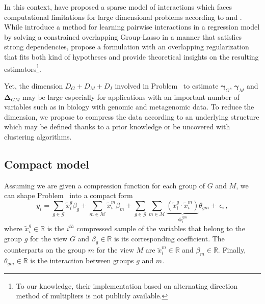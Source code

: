 \documentclass[]{book}
\let\rmarkdownfootnote\footnote%
\def\footnote{\protect\rmarkdownfootnote}
\begin{document}
In this context, \citep{bien2013lasso} have proposed a sparse model of
interactions which faces computational limitations for large dimensional
problems according to \citep{lim2015learning} and \citep{she2016group}. While
\citep{lim2015learning} introduce a method for learning pairwise interactions
in a regression model by solving a constrained overlapping Group-Lasso
\citep{jacob2009group} in a manner that satisfies strong dependencies,
\citep{she2016group} propose a formulation with an overlapping regularization
that fits both kind of hypotheses and provide theoretical insights on
the resulting estimators\footnote{To our knowledge, their implementation based on alternating
  direction method of multipliers is not publicly available.}.

Yet, the dimension \(D_{\mathit{G}} + D_{\mathit{M}} + D_I\) involved in Problem~ to
estimate \(\boldsymbol{\gamma}_{\mathit{G}}\), \(\boldsymbol{\gamma}_{\mathit{M}}\) and \(\boldsymbol{\Delta}_{\mathit{G}\mathit{M}}\) may be
large especially for applications with an important number of variables
such as in biology with genomic and metagenomic data. To reduce the
dimension, we propose to compress the data according to an underlying
structure which may be defined thanks to a prior knowledge or be
uncovered with clustering algorithms.

\hypertarget{compressdata}{%
\subsection{Compact model}\label{compressdata}}

Assuming we are given a compression function for each group of \(\mathit{G}\) and
\(\mathit{M}\), we can shape Problem~ into a compact form
\[\label{eq:compact_detailled_model}  
  y_i = 
  \sum_{g \in \mathcal{G}} \tilde{x}_i^g \beta_{g} +
  \sum_{m \in \mathcal{M}} \tilde{x}_i^m \beta_{m} +
  \sum_{g \in \mathcal{G}} \sum_{m \in \mathcal{M}}
  \underbrace{\left(\tilde{x}_i^g  \cdot
      \tilde{x}_i^m\right)}_{\boldsymbol{\phi}^{gm}_i}
  {\theta_{gm}} + \, \epsilon_i \,,\] where
\(\tilde{x}_i^g \in \mathbb{R}\) is the \(i^{th}\) compressed sample of the
variables that belong to the group \(g\) for the view \(\mathit{G}\) and
\(\beta_{g} \in \mathbb{R}\) is its corresponding coefficient. The
counterparts on the group \(m\) for the view \(\mathit{M}\) are
\(\tilde{x}_i^m \in \mathbb{R}\) and \(\beta_{m} \in \mathbb{R}\). Finally,
\(\theta_{gm} \in \mathbb{R}\) is the interaction between groups \(g\) and
\(m\).
\end{document}
